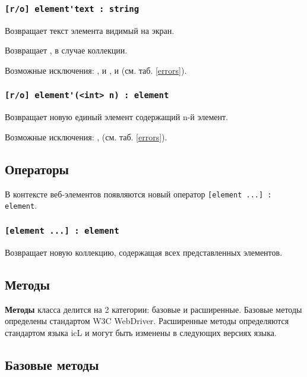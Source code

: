 \subsubsection{\lstinline|[r/o] element'text : string|}

Возвращает текст элемента видимый на экран. 

\code{[icL]} Возвращает \listtype, в случае коллекции.

Возможные исключения: ,  и ,  и  (см. таб. \ref{errors}).

\subsubsection{\lstinline|[r/o] element'(<int> n) : element|}

Возвращает новую единый элемент содержащий n-й элемент.

Возможные исключения: ,  (см. таб. \ref{errors}).

\subsection{Операторы}

В контексте веб-элементов появляются новый оператор \lstinline|[element ...] : element|.

\subsubsection{\lstinline|[element ...] : element|}

Возвращает новую коллекцию, содержащая всех представленных элементов.

\subsection{Методы}

{\bf Методы} класса  делится на 2 категории: базовые и расширенные. Базовые методы определены стандартом W3C WebDriver. Расширенные методы определяются стандартом языка icL и могут быть изменены в следующих версиях языка.

\subsection{Базовые методы}

